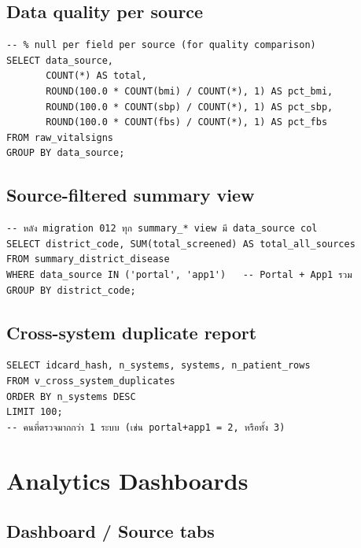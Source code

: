 \documentclass[11pt,a4paper]{article}
\begin{document}
\subsection{Data quality per source}

\begin{lstlisting}[style=sqlstyle]
-- % null per field per source (for quality comparison)
SELECT data_source,
       COUNT(*) AS total,
       ROUND(100.0 * COUNT(bmi) / COUNT(*), 1) AS pct_bmi,
       ROUND(100.0 * COUNT(sbp) / COUNT(*), 1) AS pct_sbp,
       ROUND(100.0 * COUNT(fbs) / COUNT(*), 1) AS pct_fbs
FROM raw_vitalsigns
GROUP BY data_source;
\end{lstlisting}

\subsection{Source-filtered summary view}

\begin{lstlisting}[style=sqlstyle]
-- หลัง migration 012 ทุก summary_* view มี data_source col
SELECT district_code, SUM(total_screened) AS total_all_sources
FROM summary_district_disease
WHERE data_source IN ('portal', 'app1')   -- Portal + App1 รวม
GROUP BY district_code;
\end{lstlisting}

\subsection{Cross-system duplicate report}

\begin{lstlisting}[style=sqlstyle]
SELECT idcard_hash, n_systems, systems, n_patient_rows
FROM v_cross_system_duplicates
ORDER BY n_systems DESC
LIMIT 100;
-- คนที่ตรวจมากกว่า 1 ระบบ (เช่น portal+app1 = 2, หรือทั้ง 3)
\end{lstlisting}

\section{Analytics Dashboards}

\subsection{Dashboard / Source tabs}
\end{document}

